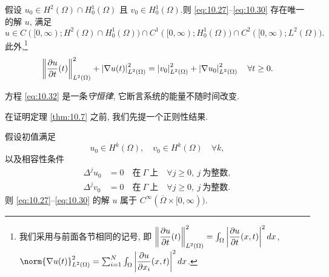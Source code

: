 \begin{keytheorem}[存在性与唯一性]
\label{thm:10.7}
假设 $u_0\in H^2(\Omega)\cap H_0^1(\Omega)$ 且 $v_0\in H_0^1(\Omega)$.则
\eqref{eq:10.27}--\eqref{eq:10.30} 存在唯一的解 $u$, 满足
\begin{equation}
u\in C([0,\infty);H^2(\Omega)\cap H_0^1(\Omega))\cap
C^1([0,\infty);H_0^1(\Omega))\cap C^2([0,\infty);L^2(\Omega)).
\label{eq:10.31}
\end{equation}
此外,\footnote{我们采用与前面各节相同的记号, 即
$\left\|\dfrac{\partial u}{\partial t}(t)\right\|^2_{L^2(\Omega)}
=\int_\Omega\left|\dfrac{\partial u}{\partial t}(x,t)\right|^2dx$,
$\norm{\nabla u(t)}^2_{L^2(\Omega)}
=\sum_{i=1}^N\int_\Omega\abs{\dfrac{\partial u}{\partial x_i}(x,t)}^2dx$.}
\begin{equation}
\left\|\frac{\partial u}{\partial t}(t)\right\|^2_{L^2(\Omega)}
+\left|\nabla u(t)\right|^2_{L^2(\Omega)}
=\left|v_0\right|^2_{L^2(\Omega)}+\left|\nabla u_0\right|^2_{L^2(\Omega)}
\quad\forall t\ge0.
\label{eq:10.32}
\end{equation}
\end{keytheorem}

\begin{remark}
\label{rem:10.6}
方程 \eqref{eq:10.32} 是一条\emph{守恒律}, 它断言系统的能量不随时间改变.
\end{remark}

在证明定理  \ref{thm:10.7} 之前, 我们先提一个正则性结果.

\begin{theorem}[正则性]
\label{thm:10.8}
假设初值满足
\begin{equation*}
u_0\in H^k(\Omega),\quad v_0\in H^k(\Omega)\quad\forall k,
\end{equation*}
以及相容性条件
\begin{align*}
\Delta^ju_0&=0\quad\text{在}\ \Gamma\ \text{上}\quad
\forall j\ge0,\ j\ \text{为整数},\\
\Delta^jv_0&=0\quad\text{在}\ \Gamma\ \text{上}\quad
\forall j\ge0,\ j\ \text{为整数}.
\end{align*}
则 \eqref{eq:10.27}--\eqref{eq:10.30} 的解 $u$ 属于
$C^\infty(\overline\Omega\times[0,\infty))$.
\end{theorem}

